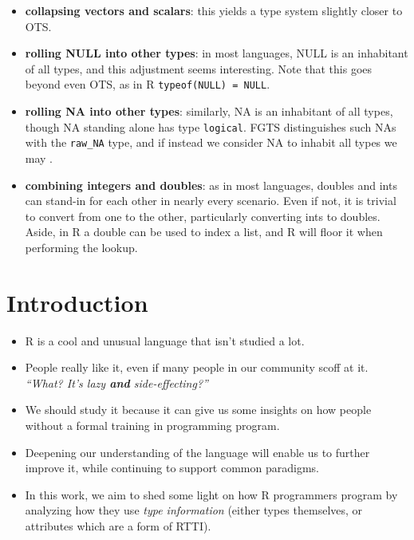 \documentclass[acmsmall,10pt,review,anonymous]{acmart}\settopmatter{printfolios=true,printccs=false,printacmref=false}
\begin{document}
\begin{itemize}

\item {\bf collapsing vectors and scalars}: this yields a type system slightly closer to OTS.

\item {\bf rolling NULL into other types}: in most languages, NULL is an inhabitant of all types, and this adjustment seems interesting.
Note that this goes beyond even OTS, as in R {\tt typeof(NULL) = NULL}.

\item {\bf rolling NA into other types}: 
similarly, NA is an inhabitant of all types, though NA standing alone has type {\tt logical}.
FGTS distinguishes such NAs with the {\tt raw\_NA} type, and if instead we consider NA to inhabit all types we may .

\item {\bf combining integers and doubles}: as in most languages, doubles and ints can stand-in for each other in nearly every scenario.
Even if not, it is trivial to convert from one to the other, particularly converting ints to doubles.
Aside, in R a double can be used to index a list, and R will floor it when performing the lookup.

\end{itemize}

%
%
%
%
%
%
\section{Introduction}



\begin{itemize}
    \item R is a cool and unusual language that isn't studied a lot.
    \item People really like it, even if many people in our community scoff at it. \textit{``What? It's lazy \textbf{and} side-effecting?''}
    \item We should study it because it can give us some insights on how people without a formal training in programming program.
    \item Deepening our understanding of the language will enable us to further improve it, while continuing to support common paradigms.
    \item In this work, we aim to shed some light on how R programmers program by analyzing how they use \textit{type information} (either types themselves, or attributes which are a form of RTTI).
\end{itemize}
\end{document}
